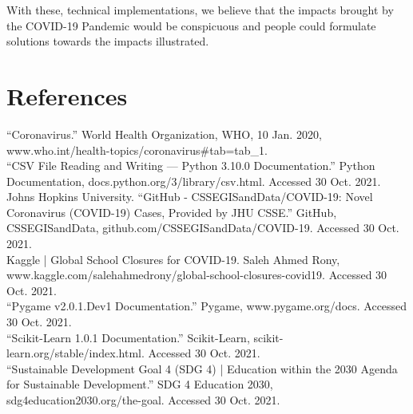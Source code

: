 \documentclass[fontsize=11pt]{article}
\begin{document}
With these, technical implementations, we believe that the impacts brought by the COVID-19 Pandemic would be conspicuous and people could formulate solutions towards the impacts illustrated. 
\newpage

\section*{References}

“Coronavirus.” World Health Organization, WHO, 10 Jan. 2020, www.who.int/health-topics/coronavirus\#tab=tab\_1.\\

“CSV File Reading and Writing — Python 3.10.0 Documentation.” Python Documentation, docs.python.org/3/library/csv.html. Accessed 30 Oct. 2021.\\

Johns Hopkins University. “GitHub - CSSEGISandData/COVID-19: Novel Coronavirus (COVID-19) Cases, Provided by JHU CSSE.” GitHub, CSSEGISandData, github.com/CSSEGISandData/COVID-19. Accessed 30 Oct. 2021.\\

Kaggle | Global School Closures for COVID-19. Saleh Ahmed Rony, www.kaggle.com/salehahmedrony/global-school-closures-covid19. Accessed 30 Oct. 2021.\\

“Pygame v2.0.1.Dev1 Documentation.” Pygame, www.pygame.org/docs. Accessed 30 Oct. 2021.\\

“Scikit-Learn 1.0.1 Documentation.” Scikit-Learn, scikit-learn.org/stable/index.html. Accessed 30 Oct. 2021.\\

“Sustainable Development Goal 4 (SDG 4) | Education within the 2030 Agenda for Sustainable Development.” SDG 4 Education 2030, sdg4education2030.org/the-goal. Accessed 30 Oct. 2021.
\end{document}
